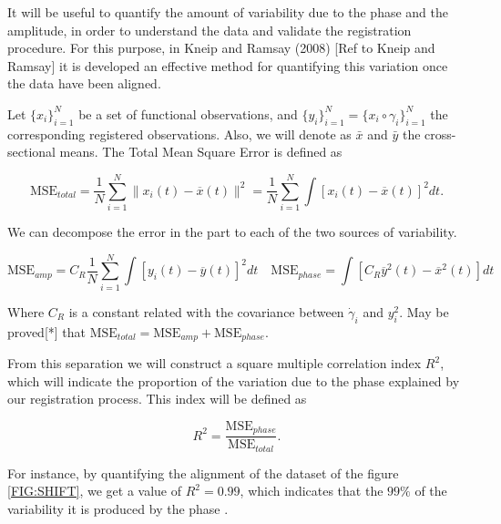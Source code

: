 It will be useful to quantify the amount of variability due to the phase and the
amplitude, in order to understand the data and validate the registration
procedure. For this purpose, in Kneip and Ramsay (2008)
[Ref to Kneip and Ramsay] it is developed an effective method for quantifying
this variation once the data have been aligned.

Let $\{x_i\}_{i=1}^N$ be a set of functional observations, and
$\{y_i\}_{i=1}^N = \{x_i \circ \gamma_i\}_{i=1}^N$ the corresponding registered
observations. Also, we will denote as $\bar x$ and $\bar y$ the
cross-sectional means. The Total Mean Square Error is defined as

$$
\text{MSE}_{total}=  \frac{1}{N}\sum_{i=1}^{N} \|x_i(t)-\overline x(t)\|^2 =
\frac{1}{N}\sum_{i=1}^{N}\int[x_i(t)-\overline x(t)]^2dt .
$$

We can decompose the error in the part to each of the two sources of variability.

$$
\text{MSE}_{amp} =  C_R \frac{1}{N}
        \sum_{i=1}^{N} \int \left [ y_i(t) - \overline{y}(t) \right ]^2 dt \quad
\text{MSE}_{phase}=
        \int \left [C_R \overline{y}^2(t) - \overline{x}^2(t) \right]dt
$$

Where $C_R$ is a constant related with the covariance between $\dot \gamma_i$
and $y_i^2$. May be  proved[*] that $\text{MSE}_{total} = \text{MSE}_{amp} + \text{MSE}_{phase}$.


From this separation we will construct a square multiple correlation index
$R^2$, which will indicate the proportion of the variation due to the phase
explained by our registration process. This index will be defined as

$$
R^2 = \frac{\text{MSE}_{phase}}{\text{MSE}_{total}}.
$$

For instance, by quantifying the alignment of the dataset of the figure
\ref{FIG:SHIFT}, we get a value of $R^2=0.99$, which indicates that the $99\%$ of
the variability it is produced by the phase .
